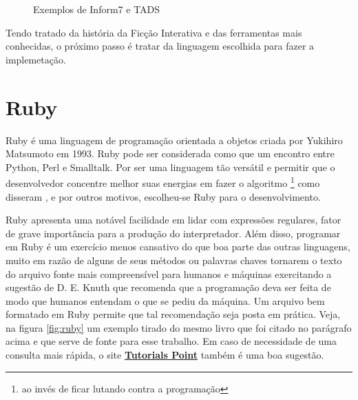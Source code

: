 \begin{figure}
  \centering
  \caption{Exemplos de Inform7 e TADS}
  \label{fig:other-tools}
\end{figure}

Tendo tratado da história da Ficção Interativa e das ferramentas mais conhecidas,
o próximo passo é tratar da linguagem escolhida para fazer a implemetação.

\section{Ruby}
\label{sec:ruby}

Ruby é uma linguagem de programação orientada a objetos criada por Yukihiro
Matsumoto em 1993. Ruby pode ser considerada como que um encontro entre Python,
Perl e Smalltalk. Por ser uma linguagem tão versátil e permitir que o
desenvolvedor concentre melhor suas energias em fazer o algoritmo \footnote{ao
invés de ficar lutando contra a programação}  como disseram \citet{Rcook:09}, e
por outros motivos, escolheu-se Ruby para o desenvolvimento.

Ruby apresenta uma notável facilidade em lidar com expressões regulares, fator
de grave importância para a produção do interpretador. Além disso, programar em
Ruby é um exercício menos cansativo do que boa parte das outras linguagens,
muito em razão de alguns de seus métodos ou palavras chaves tornarem o texto do
arquivo fonte mais compreensível para humanos e máquinas exercitando a sugestão
de D. E. Knuth que recomenda que a programação deva ser feita de modo que
humanos entendam o que se pediu da máquina. Um arquivo bem formatado em Ruby
permite que tal recomendação seja posta em prática. Veja, na figura
\ref{fig:ruby} um exemplo tirado do mesmo livro que foi citado no parágrafo
acima e que serve de fonte para esse trabalho. Em caso de necessidade de uma
consulta mais rápida, o site
\href{https://www.tutorialspoint.com/ruby/index.htm}{\textbf{Tutorials Point}}
também é uma boa sugestão.

